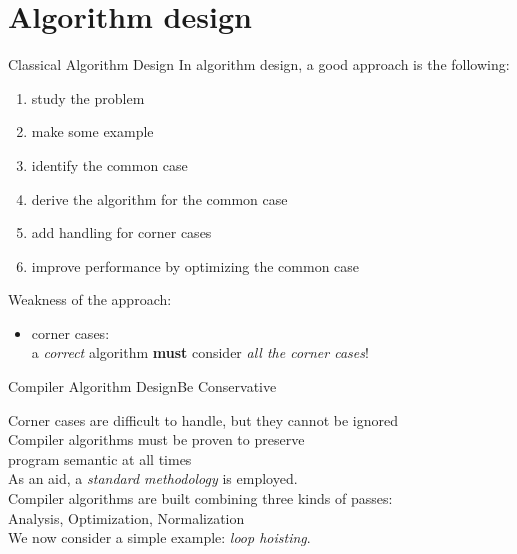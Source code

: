 
\section{Algorithm design}


\begin{frame}{Classical Algorithm Design}
In algorithm design, a good approach is the following:
\begin{enumerate}
\item study the problem
\item make some example
\item identify the \alert{common case}
\item derive the algorithm for the common case
\item add handling for \alert{corner cases}
\item improve performance by \alert{optimizing the common case}
\end{enumerate}

\vfill
Weakness of the approach:
\begin{itemize}
\item \alert{corner cases}:\\a \emph{correct} algorithm \textbf{must} consider \emph{all the corner cases}!
\end{itemize}
\end{frame}


\begin{frame}{Compiler Algorithm Design}{Be Conservative}
\begin{center}
Corner cases are difficult to handle, but they cannot be ignored\\
\smallskip
{\small Compiler algorithms must be \alert{proven} to preserve\\
program semantic \alert{at all times}}\\
\bigskip
As an aid, a \emph{standard methodology} is employed.\\
\bigskip
Compiler algorithms are built combining \alert{three} kinds of passes:\\
\medskip
Analysis, Optimization, Normalization\\
\bigskip
\pause
We now consider a simple example: \emph{loop hoisting}.
\end{center}
\end{frame}


